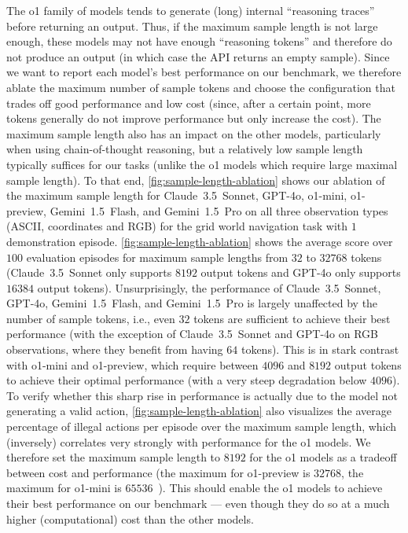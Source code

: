 \documentclass{article}
\newcommand{\ie}{i.e., }
\newcommand{\claude}{Claude~3.5~Sonnet}
\newcommand{\flash}{Gemini~1.5~Flash}
\newcommand{\pro}{Gemini~1.5~Pro}
\newcommand{\gpt}{GPT-4o}
\newcommand{\mini}{o1-mini}
\newcommand{\preview}{o1-preview}
\begin{document}
The o1 family of models tends to generate (long) internal ``reasoning traces'' before returning an output.
Thus, if the maximum sample length is not large enough, these models may not have enough ``reasoning tokens'' and therefore do not produce an output (in which case the API returns an empty sample).
Since we want to report each model's best performance on our benchmark, we therefore ablate the maximum number of sample tokens and choose the configuration that trades off good performance and low cost (since, after a certain point, more tokens generally do not improve performance but only increase the cost).
The maximum sample length also has an impact on the other models, particularly when using chain-of-thought reasoning, but a relatively low sample length typically suffices for our tasks (unlike the o1 models which require large maximal sample length).
To that end, \cref{fig:sample-length-ablation} shows our ablation of the maximum sample length for \claude{}, \gpt{}, \mini{}, \preview{}, \flash{}, and \pro{} on all three observation types (ASCII, coordinates and RGB) for the grid world navigation task with $1$ demonstration episode.
\cref{fig:sample-length-ablation} shows the average score over $100$ evaluation episodes for maximum sample lengths from $32$ to $32768$ tokens (\claude{} only supports $8192$ output tokens and \gpt{} only supports $16384$ output tokens).
Unsurprisingly, the performance of \claude{}, \gpt{}, \flash{}, and \pro{} is largely unaffected by the number of sample tokens, \ie even $32$ tokens are sufficient to achieve their best performance (with the exception of \claude{} and \gpt{} on RGB observations, where they benefit from having $64$ tokens).
This is in stark contrast with \mini{} and \preview{}, which require between $4096$ and $8192$ output tokens to achieve their optimal performance (with a very steep degradation below $4096$).
To verify whether this sharp rise in performance is actually due to the model not generating a valid action, \cref{fig:sample-length-ablation} also visualizes the average percentage of illegal actions per episode over the maximum sample length, which (inversely) correlates very strongly with performance for the o1 models.
We therefore set the maximum sample length to $8192$ for the o1 models as a tradeoff between cost and performance (the maximum for \preview{} is $32768$, the maximum for \mini{} is $65536$~\citep{openai2024reasoning}).
This should enable the o1 models to achieve their best performance on our benchmark --- even though they do so at a much higher (computational) cost than the other models.
\end{document}
